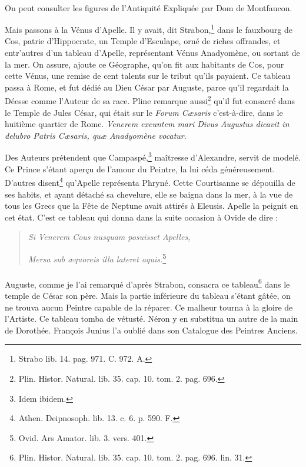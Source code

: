 \documentclass[a4paper, 11pt, oneside, polutonikogreek, french]{article}
\begin{document}
\paragraph{}
On peut consulter les figures de l'Antiquité Expliquée par Dom de Montfaucon.

Mais passons à la Vénus d'Apelle. Il y avait, dit Strabon,\footnote{Strabo lib. 14. pag. 971. C. 972. A.} dans le fauxbourg de Cos, patrie d'Hippocrate, un Temple d'Esculape, orné de riches offrandes, et entr'autres d'un tableau d'Apelle, représentant Vénus Anadyomène, ou sortant de la mer. On assure, ajoute ce Géographe, qu'on fit aux habitants de Cos, pour cette Vénus, une remise de cent talents sur le tribut qu'ils payaient. Ce tableau passa à Rome, et fut dédié au Dieu César par Auguste, parce qu'il regardait la Déesse comme l'Auteur de sa race. Pline remarque aussi\footnote{Plin. Histor. Natural. lib. 35. cap. 10. tom. 2. pag. 696.} qu'il fut consacré dans le Temple de Jules César, qui était sur le \emph{Forum Cæsaris} c'est-à-dire, dans le huitième quartier de Rome. \emph{Venerem exeuntem mari Divus Augustus dicavit in delubro Patris Cæsaris, quæ Anadyomène vocatur}.

Des Auteurs prétendent que Campaspé,\footnote{Idem ibidem.} maîtresse d'Alexandre, servit de modelé. Ce Prince s'étant aperçu de l'amour du Peintre, la lui céda généreusement. D'autres disent\footnote{Athen. Deipnosoph. lib. 13. c. 6. p. 590. F.} qu'Apelle représenta Phryné. Cette Courtisanne se dépouilla de ses habits, et ayant détaché sa chevelure, elle se baigna dans la mer, à la vue de tous les Grecs que la Fête de Neptune avait attirés à Eleusis. Apelle la peignit en cet état. C'est ce tableau qui donna dans la suite occasion à Ovide de dire :
\begin{quotation}
\emph{Si Venerem Cous nusquam posuisset Apelles,}

\hspace*{5mm}\emph{Mersa sub æquoreis illa lateret aquis.}\footnote{Ovid. Ars Amator. lib. 3. vers. 401.}
\end{quotation}
\paragraph{}
Auguste, comme je l'ai remarqué d'après Strabon, consacra ce tableau\footnote{Plin. Histor. Natural. lib. 35. cap. 10. tom. 2. pag. 696. lin. 31.} dans le temple de César son père. Mais la partie inférieure du tableau s'étant gâtée, on ne trouva aucun Peintre capable de la réparer. Ce malheur tourna à la gloire de l'Artiste. Ce tableau tomba de vétusté. Néron y en substitua un autre de la main de Dorothée. François Junius l'a oublié dans son Catalogue des Peintres Anciens.
\end{document}
